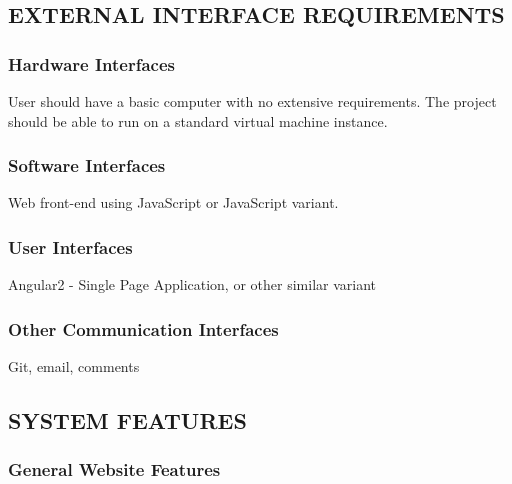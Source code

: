 \documentclass[onecolumn, draftclsnofoot,10pt, compsoc]{IEEEtran}
\begin{document}
{\subsection[EXTERNAL INTERFACE REQUIREMENTS]{EXTERNAL INTERFACE REQUIREMENTS}

\subsubsection[Hardware Interfaces]{Hardware Interfaces}
{\noindent
User should have a basic computer
with no extensive requirements. The project should be able to run on a standard virtual machine
instance.}

\subsubsection[Software Interfaces]{Software Interfaces}
{\noindent
Web front-end using JavaScript or JavaScript variant.}

\subsubsection[User Interfaces]{User Interfaces}
{\noindent
Angular2 - Single Page Application, or other similar variant}

\subsubsection[Other Communication Interfaces]{Other Communication Interfaces}
{\noindent
Git, email, comments}


\bigskip

\clearpage
\subsection[SYSTEM FEATURES]{SYSTEM FEATURES}

\subsubsection[System feature 1: General Website Features]{General Website Features}

}
\end{document}
